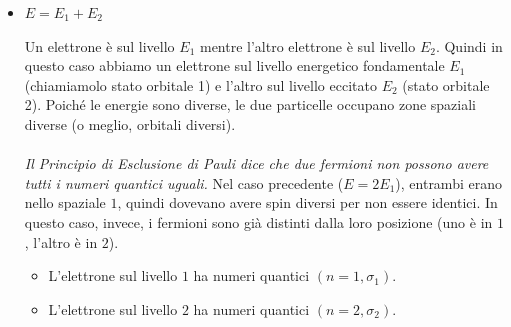 \begin{itemize}
	\begin{align*}
		\text{numero di conteggi} & = \mqty(2s + 1 \\ 2) = \frac{\qty(2s + 1)!}{2! \, \qty(\qty(2s + 1) - 2)!} = \frac{\qty(2s + 1) \qty(2s) \qty(2s - 1)!}{ 2! \qty( 2s - 1)!} \\
		& = \frac{\qty(2s + 1) \qty(2s)}{2} = s  \qty(2 s + 1)
	\end{align*}
	
		Ho quindi $s \qty(2s + 1)$ stati possibili su questo livello energetico.
	
	\begin{myapprf}
		\textbf{Esempio:}
		\\
		\\
		Per 2 fermioni identici, per esempio $2$ elettroni, otteniamo: $s = 1/2$. Allora abbiamo:
		\begin{align*}
			s\qty(2s + 1) = 1
		\end{align*}
		È corretto? Sì. Se due elettroni sono nello stesso orbitale spaziale (simmetrico), devono essere nel singoletto di spin (antisimmetrico):
		\begin{align*}
			\frac{1}{\sqrt{2}} \, \qty(\ket{+} \ket{-} - \ket{-} \ket{+})
		\end{align*}
		C'è un solo stato possibile. Se provassero a stare in uno stato di spin simmetrico (i 3 stati del tripletto), la funzione totale diventerebbe simmetrica, il che è vietato per i fermioni (Pauli).

	\end{myapprf}
		
	\item $E = E_1 + E_2$
	
		Un elettrone è sul livello $E_1$ mentre l'altro elettrone è sul livello $E_2$. Quindi in questo caso abbiamo un elettrone sul livello energetico fondamentale $E_1$ (chiamiamolo stato orbitale 1) e l'altro sul livello eccitato $E_2$ (stato orbitale 2).
Poiché le energie sono diverse, le due particelle occupano zone spaziali diverse (o meglio, orbitali diversi).
	\\
	\\
		\textit{Il Principio di Esclusione di Pauli dice che due fermioni non possono avere tutti i numeri quantici uguali.} Nel caso precedente ($E=2E_1$), entrambi erano nello spaziale $1$, quindi dovevano avere spin diversi per non essere identici. In questo caso, invece, i fermioni sono già distinti dalla loro posizione (uno è in $1$, l'altro è in $2$).
	\begin{itemize}
		\item L'elettrone sul livello $1$ ha numeri quantici $(n=1, \sigma_1)$.
		\item L'elettrone sul livello $2$ ha numeri quantici $(n=2, \sigma_2)$.
	\end{itemize}
	

\end{itemize}
